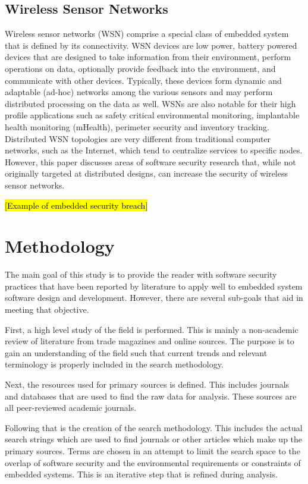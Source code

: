 \documentclass[final,conference,11pt]{IEEEtran}
\begin{document}
\subsection{Wireless Sensor Networks}

Wireless sensor networks (WSN) comprise a special class of embedded system that is defined by its connectivity.  WSN devices are low power, battery powered devices that are designed to take information from their environment, perform operations on data, optionally provide feedback into the environment, and communicate with other devices.  Typically, these devices form dynamic and adaptable (ad-hoc) networks among the various sensors and may perform distributed processing on the data as well.\cite{Singh2011}  WSNs are also notable for their high profile applications such as safety critical environmental monitoring, implantable health monitoring (mHealth), perimeter security and inventory tracking.\cite{Bojinov2010,Mahdavi-Hezavehi2013,Sahoo2012}  Distributed WSN topologies are very different from traditional computer networks, such as the Internet, which tend to centralize services to specific nodes. However, this paper discusses areas of software security research that, while not originally targeted at distributed designs, can increase the security of wireless sensor networks.

\hl{[Example of embedded security breach]}

\section{Methodology}
The main goal of this study is to provide the reader with software security practices that have been reported by literature to apply well to embedded system software design and development.  However, there are several sub-goals that aid in meeting that objective.  

First, a high level study of the field is performed.  This is mainly a non-academic review of literature from trade magazines and online sources. The purpose is to gain an understanding of the field such that current trends and relevant terminology is properly included in the search methodology.

Next, the resources used for primary sources is defined.  This includes journals and databases that are used to find the raw data for analysis.  These sources are all peer-reviewed academic journals.

Following that is the creation of the search methodology.  This includes the actual search strings which are used to find journals or other articles which make up the primary sources.  Terms are chosen in an attempt to limit the search space to the overlap of software security and the environmental requirements or constraints of embedded systems.  This is an iterative step that is refined during analysis.
\end{document}
